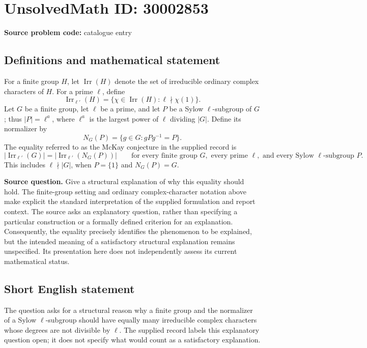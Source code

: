\documentclass[11pt]{article}
\begin{document}
\section*{UnsolvedMath ID: 30002853}
\textbf{Source problem code:} catalogue entry
\subsection{Definitions and mathematical statement}
For a finite group \(H\), let \(\operatorname{Irr}(H)\) denote the set of irreducible ordinary complex characters of \(H\). For a prime \(\ell\), define
\[
\operatorname{Irr}_{\ell'}(H)=\{\chi\in\operatorname{Irr}(H):\ell\nmid\chi(1)\}.
\]
Let \(G\) be a finite group, let \(\ell\) be a prime, and let \(P\) be a Sylow \(\ell\)-subgroup of \(G\); thus \(|P|=\ell^a\), where \(\ell^a\) is the largest power of \(\ell\) dividing \(|G|\). Define its normalizer by
\[
N_G(P)=\{g\in G:gPg^{-1}=P\}.
\]
The equality referred to as the McKay conjecture in the supplied record is
\[
\bigl|\operatorname{Irr}_{\ell'}(G)\bigr|
=
\bigl|\operatorname{Irr}_{\ell'}(N_G(P))\bigr|
\qquad\text{for every finite group }G,\text{ every prime }\ell,\text{ and every Sylow }\ell\text{-subgroup }P.
\]
This includes \(\ell\nmid |G|\), when \(P=\{1\}\) and \(N_G(P)=G\).

\textbf{Source question.} Give a structural explanation of why this equality should hold. The finite-group setting and ordinary complex-character notation above make explicit the standard interpretation of the supplied formulation and report context. The source asks an explanatory question, rather than specifying a particular construction or a formally defined criterion for an explanation. Consequently, the equality precisely identifies the phenomenon to be explained, but the intended meaning of a satisfactory structural explanation remains unspecified. Its presentation here does not independently assess its current mathematical status.
\subsection{Short English statement}
The question asks for a structural reason why a finite group and the normalizer of a Sylow \(\ell\)-subgroup should have equally many irreducible complex characters whose degrees are not divisible by \(\ell\). The supplied record labels this explanatory question open; it does not specify what would count as a satisfactory explanation.
\end{document}

